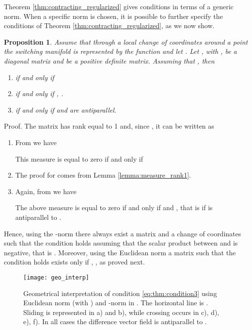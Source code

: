 \documentclass[twocolumn]{autart}
\newtheorem{proposition}{Proposition}
\begin{document}
Theorem \ref{thm:contracting_regularized} gives conditions in terms of a generic norm. When a specific norm is chosen, it is possible to further specify the conditions of Theorem \ref{thm:contracting_regularized}, as we now show.
\begin{proposition}
\label{thm:condition3}
Assume that through a local change of coordinates around a point  the switching manifold  is represented by the function  and let . Let , with , be a diagonal matrix and  be a positive definite matrix. Assuming that , then
\begin{enumerate}
\item
 if and only if

\item
 if and only if , .
\item
 if and only if  and  are antiparallel.
\end{enumerate}
\end{proposition}
\begin{pf*}{Proof.}
The matrix  has rank equal to 1 and, since , it can be written as

\begin{enumerate}
\item
From \citep[Lemma 4]{vidyasagar1978matrix} we have

This measure is equal to zero if and only if

\item
The proof for  comes from Lemma \ref{lemma:measure_rank1}.
\item
Again, from \citep[Lemma 4]{vidyasagar1978matrix} we have

The above measure is equal to zero if and only if  and , that is if  is antiparallel to .
\end{enumerate}
\end{pf*}
Hence, using the -norm there always exist a matrix  and a change of coordinates such that the condition holds assuming that the scalar product between  and  is negative, that is . Moreover, using the Euclidean norm a matrix  such that the condition holds exists only if  , , as proved next.
\begin{figure}[!t]
\begin{center}
\texttt{[image: geo\_interp]}
\caption{Geometrical interpretation of condition \eqref{eq:thm:condition3} using Euclidean norm (with ) and -norm in . The horizontal line is . Sliding is represented in a) and b), while crossing occurs in c), d), e), f). In all cases the difference vector field  is antiparallel to .}
\label{fig:geo_interp}
\end{center}
\end{figure}
\end{document}
